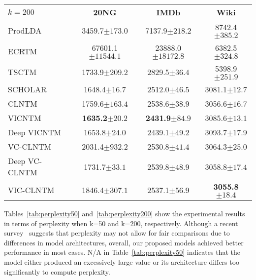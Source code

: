 \documentclass{article}
\begin{document}
\begin{appendices}
\begin{table*}[ht]
\end{table*}

\begin{table*}[ht]
    \centering
    \caption{Results of perplexity of NTMs when $k=200$. The boldface indicates the best performance for each experiment}
    \label{tab:perplexity200}
    \begin{tabular*}{\textwidth}{@{\extracolsep\fill}lccc}
        \hline
        $k=200$              & 20NG                   & IMDb                   & Wiki                   \\ \hline
        ProdLDA       & 3459.7{\tiny $\pm173.0$}              & 7137.9{\tiny $\pm218.2$}          & 8742.4{\tiny $\pm385.2$}          \\
        ECRTM         & 67601.1{\tiny $\pm11544.1$}           & 23888.0{\tiny $\pm18172.8$}       & 6382.5{\tiny $\pm324.8$}          \\
        TSCTM         & 1733.9{\tiny $\pm209.2$}              & 2829.5{\tiny $\pm36.4$}          & 5398.9{\tiny $\pm251.9$}          \\
        SCHOLAR       & 1648.4{\tiny $\pm16.7$}               & 2512.0{\tiny $\pm46.5$}          & 3081.1{\tiny $\pm12.7$}          \\
        CLNTM         & 1759.6{\tiny $\pm163.4$}              & 2538.6{\tiny $\pm38.9$}          & 3056.6{\tiny $\pm16.7$}          \\ \hline
        VICNTM        & {\bf 1635.2{\tiny $\pm20.2$}}         & {\bf 2431.9{\tiny $\pm84.9$}}    & 3085.6{\tiny $\pm13.1$}          \\
        Deep VICNTM   & 1653.8{\tiny $\pm24.0$}               & 2439.1{\tiny $\pm49.2$}          & 3093.7{\tiny $\pm17.9$} \\
        VC-CLNTM      & 2031.4{\tiny $\pm932.2$}              & 2530.8{\tiny $\pm41.4$}          & 3064.3{\tiny $\pm25.0$}          \\
        Deep VC-CLNTM & 1731.7{\tiny $\pm33.1$}               & 2539.8{\tiny $\pm48.9$}          & 3058.8{\tiny $\pm17.4$}          \\
        VIC-CLNTM     & 1846.4{\tiny $\pm307.1$}              & 2537.1{\tiny $\pm56.9$}          & {\bf 3055.8{\tiny $\pm18.4$}}          \\ \hline
        \end{tabular*}
\end{table*}
    
Tables~\ref{tab:perplexity50} and~\ref{tab:perplexity200} show the experimental results in terms of perplexity when k=50 and k=200, respectively. 
Although a recent survey~\cite{wu2024survey} suggests that perplexity may not allow for fair comparisons due to differences in model architectures, overall, our proposed models achieved better performance in most cases. 
N/A in Table~\ref{tab:perplexity50} indicates that the model either produced an excessively large value or its architecture differs too significantly to compute perplexity.

\end{appendices}



\end{document}
